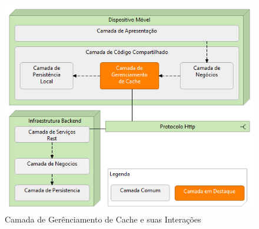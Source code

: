 \documentclass[
	article,			%
	11pt,				%
	oneside,			%
	a4paper,			%
	english,			%
	brazil,				%
	sumario=tradicional
]{abntex2}
\begin{document}
\begin{figure}
	\centering
	\includegraphics[scale=0.7]{images/CamadasNivel0}
	\caption{Camada de Gerênciamento de Cache e suas Interações}
\end{figure}
\end{document}
